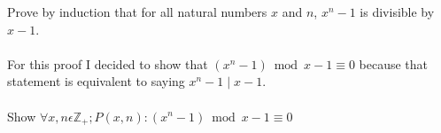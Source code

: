 \documentclass[12pt]{article}
\begin{document}
Prove by induction that for all natural numbers \begin{math}x\end{math} and \begin{math}n\end{math}, \begin{math}x^n - 1\end{math} is divisible by \begin{math}x - 1\end{math}.\\\\
\noindent For this proof I decided to show that \begin{math}(x^n - 1)\bmod{x - 1}\equiv 0\end{math} because that statement is equivalent to saying \begin{math}x^n - 1\mid x - 1\end{math}.\\\\
\noindent Show \begin{math}\forall x,n \epsilon \mathbb{Z}_+ ;P(x,n):(x^n - 1)\bmod{x - 1}\equiv 0\end{math} 
\end{document}
